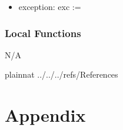 \documentclass[12pt, titlepage]{article}
\begin{document}
\begin{itemize}
	\item exception: exc := \\
\end{itemize}


\subsubsection{Local Functions}
N/A

\newpage











 {plainnat}
 {../../../refs/References}

\newpage

\section{Appendix} \label{Appendix}

\end{document}

